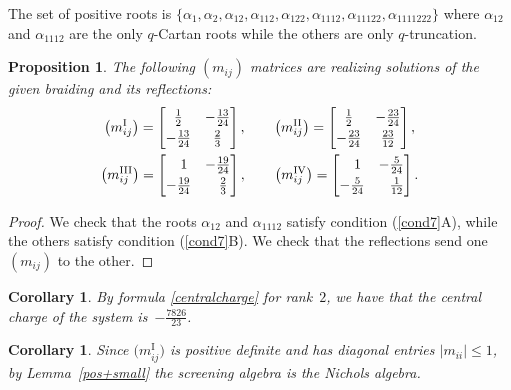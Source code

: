 \documentclass[10pt,a4paper]{amsart}
\numberwithin{equation}{section}
\newtheorem{cor}[teo]{Corollary}
\newtheorem{prop}[teo]{Proposition}
\begin{document}
The set of positive roots is $\lbrace \alpha_1, \alpha_2, \alpha_{12}, \alpha_{112}, \alpha_{122}, \alpha_{1112}, \alpha_{11122}, \alpha_{1111222}\rbrace$ where $\alpha_{12}$ and $\alpha_{1112}$ are the only $q$-Cartan roots while the others are only $q$-truncation.
\begin{prop}
The following $(m_{ij})$ matrices are realizing solutions of the given braiding and its reflections:
\begin{gather*}
\big(m_{ij}^{\mathrm{I}}\big)=  \begin{bmatrix}
 \frac{1}{2} & -\frac{13}{24}\vspace{1mm}\\
 -\frac{13}{24} & \frac{2}{3}
\end{bmatrix}, \qquad
\big(m_{ij}^{\mathrm{II}}\big)= \begin{bmatrix}
 \frac{1}{2} & -\frac{23}{24}\vspace{1mm}\\
 -\frac{23}{24} & \frac{23}{12}
\end{bmatrix}, \\
\big(m_{ij}^{\mathrm{III}}\big)=  \begin{bmatrix}
 \hphantom{-}1 & -\frac{19}{24}\vspace{1mm}\\
 -\frac{19}{24} & \hphantom{-}\frac{2}{3}
\end{bmatrix}, \qquad
\big(m_{ij}^{\mathrm{IV}}\big)= \begin{bmatrix}
 \hphantom{-}1 & -\frac{5}{24}\vspace{1mm}\\
 -\frac{5}{24} & \hphantom{-}\frac{1}{12}
\end{bmatrix}.
\end{gather*}
\end{prop}
\begin{proof}
We check that the roots $\alpha_{12}$ and $\alpha_{1112}$ satisfy condition (\ref{cond7}A), while the others satisfy condition (\ref{cond7}B).
We check that the reflections send one $(m_{ij})$ to the other.
\end{proof}
\begin{cor}
By formula \eqref{centralcharge} for rank~$2$, we have that the central charge of the system is~$-\frac{7826}{23}$.
\end{cor}

\begin{cor}Since $\big(m_{ij}^{\mathrm{I}}\big)$ is positive definite and has diagonal entries $|m_{ii}|\leq 1$, by Lem\-ma~{\rm \ref{pos+small}} the screening algebra is the Nichols algebra.
\end{cor}
\end{document}
